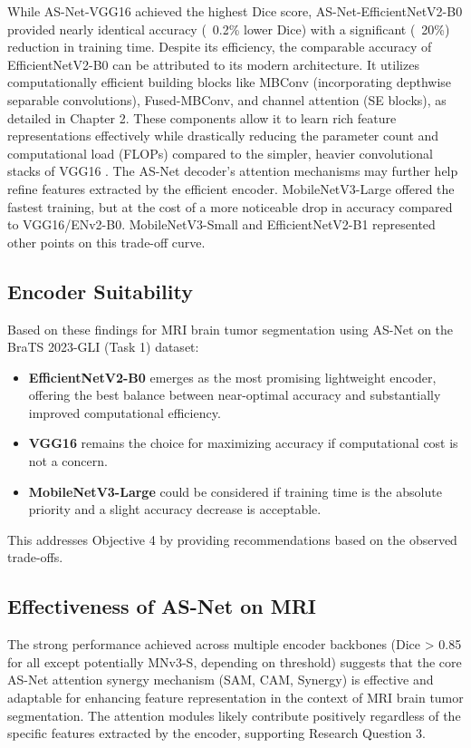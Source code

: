 While AS-Net-VGG16 achieved the highest Dice score, AS-Net-EfficientNetV2-B0 provided nearly identical accuracy (~0.2\% lower Dice) with a significant (~20\%) reduction in training time. Despite its efficiency, the comparable accuracy of EfficientNetV2-B0 can be attributed to its modern architecture. It utilizes computationally efficient building blocks like MBConv (incorporating depthwise separable convolutions), Fused-MBConv, and channel attention (SE blocks), as detailed in Chapter 2. These components allow it to learn rich feature representations effectively while drastically reducing the parameter count and computational load (FLOPs) compared to the simpler, heavier convolutional stacks of VGG16 \parencite{tan2021efficientnetv2, hu2018squeeze, canziani2016analysis}. The AS-Net decoder's attention mechanisms may further help refine features extracted by the efficient encoder. MobileNetV3-Large offered the fastest training, but at the cost of a more noticeable drop in accuracy compared to VGG16/ENv2-B0. MobileNetV3-Small and EfficientNetV2-B1 represented other points on this trade-off curve.

\subsection{Encoder Suitability}
Based on these findings for MRI brain tumor segmentation using AS-Net on the BraTS 2023-GLI (Task 1) dataset:
\begin{itemize}
  \item \textbf{EfficientNetV2-B0} emerges as the most promising lightweight encoder, offering the best balance between near-optimal accuracy and substantially improved computational efficiency.
  \item \textbf{VGG16} remains the choice for maximizing accuracy if computational cost is not a concern.
  \item \textbf{MobileNetV3-Large} could be considered if training time is the absolute priority and a slight accuracy decrease is acceptable.
\end{itemize}
This addresses Objective 4 by providing recommendations based on the observed trade-offs.

\subsection{Effectiveness of AS-Net on MRI}
The strong performance achieved across multiple encoder backbones (Dice > 0.85 for all except potentially MNv3-S, depending on threshold) suggests that the core AS-Net attention synergy mechanism (SAM, CAM, Synergy) is effective and adaptable for enhancing feature representation in the context of MRI brain tumor segmentation. The attention modules likely contribute positively regardless of the specific features extracted by the encoder, supporting Research Question 3.

